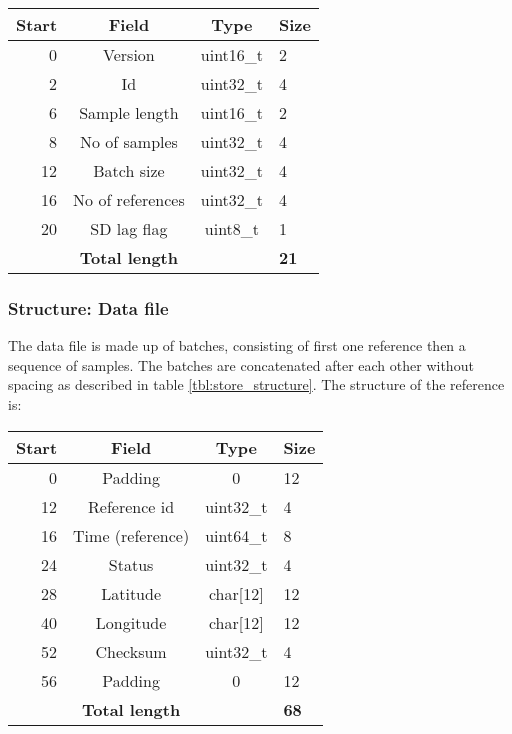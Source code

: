 \documentclass[a4paper]{article}
\begin{document}
\begin{multicols}{2}
  \begin{tabular}{|r|c|c|l|}
    \hline
    \bfseries Start & \bfseries Field & \bfseries  Type & \bfseries Size  \\
    \hline
    0   & Version             & uint16\_t & 2 \\ \hline
    2   & Id                  & uint32\_t & 4 \\ \hline
    6   & Sample length       & uint16\_t & 2 \\ \hline
    8   & No of samples       & uint32\_t & 4 \\ \hline
    12  & Batch size          & uint32\_t & 4 \\ \hline
    16  & No of references    & uint32\_t & 4 \\ \hline
    20  & SD lag flag         & uint8\_t  & 1 \\ \hline
    & \textbf{Total length}   &           & \textbf{21} \\ \hline
  \end{tabular}
  \label{tab:index_binary_fields}

  \subsubsection{Structure: Data file}
  The data file is made up of batches, consisting of first one reference
  then a sequence of samples. The batches are concatenated after each
  other without spacing as described in table \ref{tbl:store_structure}.
  The structure of the reference is:
  \vspace{1em}

  \begin{tabular}{|r|c|c|l|}
    \hline
    \bfseries Start   &     \bfseries Field     &   \bfseries Type
    &   \bfseries Size  \\ \hline
    0   & Padding           & 0           & 12 \\ \hline
    12  & Reference id      & uint32\_t   & 4 \\ \hline
    16  & Time (reference)  & uint64\_t   & 8 \\ \hline
    24  & Status            & uint32\_t   & 4 \\ \hline
    28  & Latitude          & char[12]    & 12 \\ \hline
    40  & Longitude         & char[12]    & 12 \\ \hline
    52  & Checksum          & uint32\_t   & 4 \\ \hline
    56  & Padding           & 0           & 12  \\ \hline
    & \textbf{Total length} &  & \textbf{68} \\ \hline
  \end{tabular}
  \label{tab:reference_binary_fields}


\end{multicols}
\end{document}
